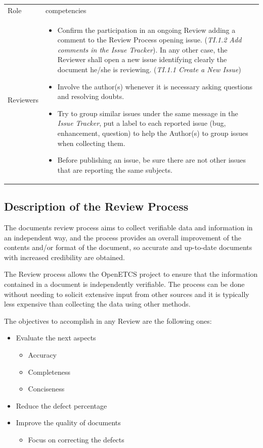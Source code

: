 \documentclass{template/openetcs_article}
\begin{document}
\begin{flushleft}
\begin{tabular}{|m{3cm}|m{11cm}|}
\hline
\rowcolor{myblue}
\multicolumn{2}{|c|}{Roles} \\\hline
\rowcolor{lightgray}
Role &
competencies 
\\\hline
Reviewers &
\begin{itemize}
\item Confirm the participation in an ongoing Review adding a comment to the Review Process opening issue. ({\it TI.1.2 Add comments in the Issue Tracker}). In any other case, the Reviewer shall open a new issue identifying clearly the document he/she is reviewing. ({\it TI.1.1 Create a New Issue})
\item Involve the author(s) whenever it is necessary asking questions and resolving doubts.
\item Try to group similar issues under the same message in the {\it Issue Tracker}, put a label to each reported issue (bug, enhancement, question) to help the Author(s) to group issues when collecting them.
\item Before publishing an issue, be sure there are not other issues that are reporting the same subjects.
\end{itemize}
\\\hline
\end{tabular}
\end{flushleft}

\subsection{Description of the Review Process}

The documents review process aims to collect verifiable data and information in an independent way, and the process provides an overall improvement of the contents and/or format of the document, so accurate and up-to-date documents with increased credibility are obtained.

The Review process allows the OpenETCS project to ensure that the information contained in a document is independently verifiable. The process can be done without needing to solicit extensive input
from other sources and it is typically less expensive than collecting the data using other methods.

The objectives to accomplish in any Review are the following ones:

\begin{itemize}
\item Evaluate the next aspects
\begin{itemize}
\item Accuracy
\item Completeness
\item Conciseness
\end{itemize}
\item Reduce the defect percentage
\item Improve the quality of documents
\begin{itemize}
\item Focus on correcting the defects
\end{itemize}
\end{itemize}
\end{document}
